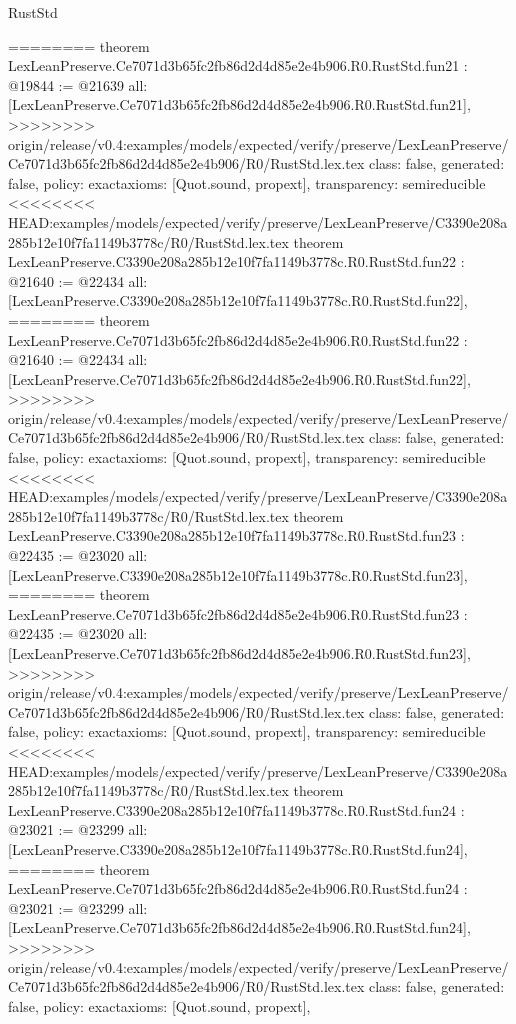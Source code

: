 \begin{lexlean}{RustStd}
\begin{coremodule}
{\begin{coremodule}
{{{{{{{{{{{{{{{{{{{{{{{{========
theorem LexLeanPreserve.Ce7071d3b65fc2fb86d2d4d85e2e4b906.R0.RustStd.fun21 : @19844 := @21639 {
  all: [LexLeanPreserve.Ce7071d3b65fc2fb86d2d4d85e2e4b906.R0.RustStd.fun21],
>>>>>>>> origin/release/v0.4:examples/models/expected/verify/preserve/LexLeanPreserve/Ce7071d3b65fc2fb86d2d4d85e2e4b906/R0/RustStd.lex.tex
  class: false,
  generated: false,
  policy: exact{axioms: [Quot.sound, propext]},
  transparency: semireducible
}
<<<<<<<< HEAD:examples/models/expected/verify/preserve/LexLeanPreserve/C3390e208a285b12e10f7fa1149b3778c/R0/RustStd.lex.tex
theorem LexLeanPreserve.C3390e208a285b12e10f7fa1149b3778c.R0.RustStd.fun22 : @21640 := @22434 {
  all: [LexLeanPreserve.C3390e208a285b12e10f7fa1149b3778c.R0.RustStd.fun22],
========
theorem LexLeanPreserve.Ce7071d3b65fc2fb86d2d4d85e2e4b906.R0.RustStd.fun22 : @21640 := @22434 {
  all: [LexLeanPreserve.Ce7071d3b65fc2fb86d2d4d85e2e4b906.R0.RustStd.fun22],
>>>>>>>> origin/release/v0.4:examples/models/expected/verify/preserve/LexLeanPreserve/Ce7071d3b65fc2fb86d2d4d85e2e4b906/R0/RustStd.lex.tex
  class: false,
  generated: false,
  policy: exact{axioms: [Quot.sound, propext]},
  transparency: semireducible
}
<<<<<<<< HEAD:examples/models/expected/verify/preserve/LexLeanPreserve/C3390e208a285b12e10f7fa1149b3778c/R0/RustStd.lex.tex
theorem LexLeanPreserve.C3390e208a285b12e10f7fa1149b3778c.R0.RustStd.fun23 : @22435 := @23020 {
  all: [LexLeanPreserve.C3390e208a285b12e10f7fa1149b3778c.R0.RustStd.fun23],
========
theorem LexLeanPreserve.Ce7071d3b65fc2fb86d2d4d85e2e4b906.R0.RustStd.fun23 : @22435 := @23020 {
  all: [LexLeanPreserve.Ce7071d3b65fc2fb86d2d4d85e2e4b906.R0.RustStd.fun23],
>>>>>>>> origin/release/v0.4:examples/models/expected/verify/preserve/LexLeanPreserve/Ce7071d3b65fc2fb86d2d4d85e2e4b906/R0/RustStd.lex.tex
  class: false,
  generated: false,
  policy: exact{axioms: [Quot.sound, propext]},
  transparency: semireducible
}
<<<<<<<< HEAD:examples/models/expected/verify/preserve/LexLeanPreserve/C3390e208a285b12e10f7fa1149b3778c/R0/RustStd.lex.tex
theorem LexLeanPreserve.C3390e208a285b12e10f7fa1149b3778c.R0.RustStd.fun24 : @23021 := @23299 {
  all: [LexLeanPreserve.C3390e208a285b12e10f7fa1149b3778c.R0.RustStd.fun24],
========
theorem LexLeanPreserve.Ce7071d3b65fc2fb86d2d4d85e2e4b906.R0.RustStd.fun24 : @23021 := @23299 {
  all: [LexLeanPreserve.Ce7071d3b65fc2fb86d2d4d85e2e4b906.R0.RustStd.fun24],
>>>>>>>> origin/release/v0.4:examples/models/expected/verify/preserve/LexLeanPreserve/Ce7071d3b65fc2fb86d2d4d85e2e4b906/R0/RustStd.lex.tex
  class: false,
  generated: false,
  policy: exact{axioms: [Quot.sound, propext]},
}}}}}}}}}}}}}}}}}}}}}}}}}}}}
\end{coremodule}}
\end{coremodule}
\end{lexlean}
